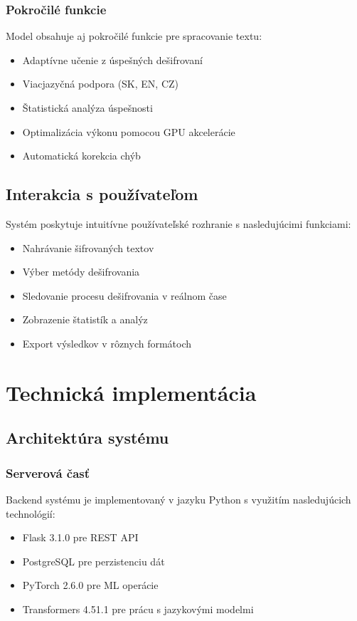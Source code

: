 \subsection{Pokročilé funkcie}
Model obsahuje aj pokročilé funkcie pre spracovanie textu:

\begin{itemize}
    \item Adaptívne učenie z úspešných dešifrovaní
    \item Viacjazyčná podpora (SK, EN, CZ)
    \item Štatistická analýza úspešnosti
    \item Optimalizácia výkonu pomocou GPU akcelerácie
    \item Automatická korekcia chýb
\end{itemize}

\section{Interakcia s používateľom}
Systém poskytuje intuitívne používateľské rozhranie s nasledujúcimi funkciami:

\begin{itemize}
    \item Nahrávanie šifrovaných textov
    \item Výber metódy dešifrovania
    \item Sledovanie procesu dešifrovania v reálnom čase
    \item Zobrazenie štatistík a analýz
    \item Export výsledkov v rôznych formátoch
\end{itemize}

\chapter{Technická implementácia}

\section{Architektúra systému}
\subsection{Serverová časť}
Backend systému je implementovaný v jazyku Python s využitím nasledujúcich technológií:

\begin{itemize}
    \item Flask 3.1.0 pre REST API
    \item PostgreSQL pre perzistenciu dát
    \item PyTorch 2.6.0 pre ML operácie
    \item Transformers 4.51.1 pre prácu s jazykovými modelmi
\end{itemize}

